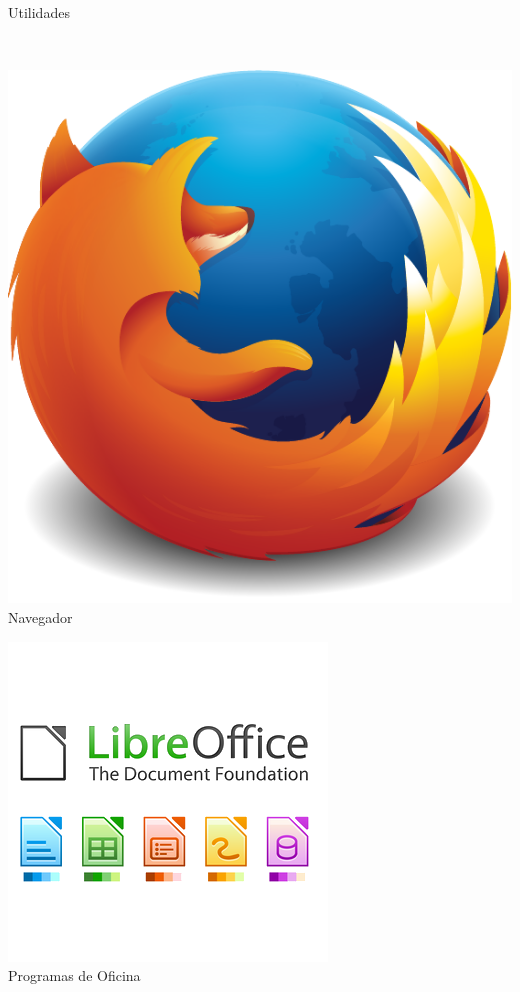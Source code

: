 \documentclass[hyperref={colorlinks}]{beamer}
\begin{document}
\begin{frame}
\begin{minipage}[b][.30\textheight][t]{.3\textwidth}
	    \centering Utilidades 
    \end{minipage}\\
    \vspace{.10\textheight}
    \begin{minipage}[b][.30\textheight][t]{.3\textwidth}
	    \includegraphics[width=.7\textwidth]{figs/firefox.pdf}\\
	    \centering Navegador
    \end{minipage}\hfill
    \begin{minipage}[b][.30\textheight][t]{.3\textwidth}
	    \includegraphics[width=.7\textwidth]{figs/libreoffice.png}\\
	    \centering Programas de Oficina
    \end{minipage}


\end{frame}
\end{document}

